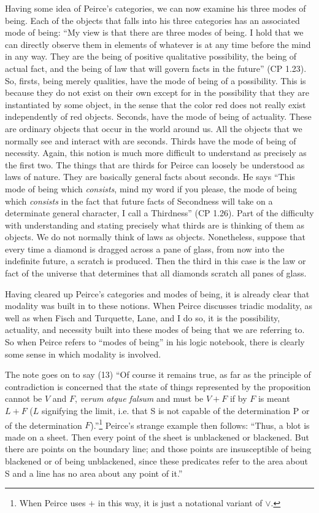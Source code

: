 Having some idea of Peirce's categories, we can now examine his three modes of being. Each of the objects that falls into his three categories has an associated mode of being: ``My view is that there are three modes of being. I hold that we can directly observe them in elements of whatever is at any time before the mind in any way. They are the being of positive qualitative possibility, the being of actual fact, and the being of law that will govern facts in the future'' (CP 1.23). So, firsts, being merely qualities, have the mode of being of a possibility. This is because they do not exist on their own except for in the possibility that they are instantiated by some object, in the sense that the color red does not really exist independently of red objects. Seconds, have the mode of being of actuality. These are ordinary objects that occur in the world around us. All the objects that we normally see and interact with are seconds. Thirds have the mode of being of necessity. Again, this notion is much more difficult to understand as precisely as the first two. The things that are thirds for Peirce can loosely be understood as laws of nature. They are basically general facts about seconds. He says ``This mode of being which \textit{consists}, mind my word if you please, the mode of being which \textit{consists} in the fact that future facts of Secondness will take on a determinate general character, I call a Thirdness'' (CP 1.26). Part of the difficulty with understanding and stating precisely what thirds are is thinking of them as objects. We do not normally think of laws as objects. Nonetheless, suppose that every time a diamond is dragged across a pane of glass, from now into the indefinite future, a scratch is produced. Then the third in this case is the law or fact of the universe that determines that all diamonds scratch all panes of glass.

Having cleared up Peirce's categories and modes of being, it is already clear that modality was built in to these notions. When Peirce discusses triadic modality, as well as when Fisch and Turquette, Lane, and I do so, it is the possibility, actuality, and necessity built into these modes of being that we are referring to. So when Peirce refers to ``modes of being'' in his logic notebook, there is clearly some sense in which modality is involved.

The note goes on to say (13) ``Of course it remains true, as far as the principle of contradiction is concerned that the state of things represented by the proposition cannot be $V$ and $F$, \textit{verum atque falsum} and must be $V+F$ if by $F$ is meant $L+F$ ($L$ signifying the limit, i.e. that S is not capable of the determination P or of the determination $F$).''\footnote{When Peirce uses $+$ in this way, it is just a notational variant of $\lor$.} Peirce's strange example then follows: ``Thus, a blot is made on a sheet. Then every point of the sheet is unblackened or blackened. But there are points on the boundary line; and those points are insusceptible of being blackened or of being unblackened, since these predicates refer to the area about S and a line has no area about any point of it.'' 

